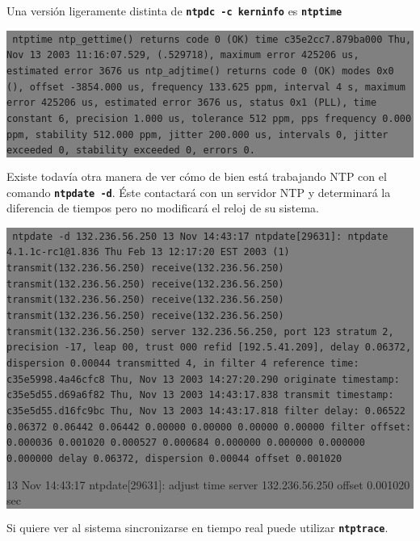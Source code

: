 \documentclass[12pt]{article}
\begin{document}
	
Una versión ligeramente distinta de \texttt{\textbf{ntpdc -c kerninfo}} es \texttt{\textbf{ntptime}}


\colorbox{grey}{\parbox[t]{0.95\linewidth}{ \vspace*{0.5cm} {\tt 
ntptime
ntp\_gettime() returns code 0 (OK)
  time c35e2cc7.879ba000  Thu, Nov 13 2003 11:16:07.529, (.529718),
  maximum error 425206 us, estimated error 3676 us
ntp\_adjtime() returns code 0 (OK)
  modes 0x0 (),
  offset -3854.000 us, frequency 133.625 ppm, interval 4 s,
  maximum error 425206 us, estimated error 3676 us,
  status 0x1 (PLL),
  time constant 6, precision 1.000 us, tolerance 512 ppm,
  pps frequency 0.000 ppm, stability 512.000 ppm, jitter 200.000 us,
  intervals 0, jitter exceeded 0, stability exceeded 0, errors 0.
 } \vspace*{0.5cm} } } 

	
	
	

Existe todavía otra manera de ver cómo de bien está trabajando NTP con 
el comando \texttt{\textbf{ntpdate -d}}. Éste contactará con un servidor NTP y
determinará la diferencia de tiempos pero no modificará el reloj de su sistema.



\colorbox{grey}{\parbox[t]{0.95\linewidth}{ \vspace*{0.5cm} {\tt 
ntpdate -d 132.236.56.250
13 Nov 14:43:17 ntpdate[29631]: ntpdate 4.1.1c-rc1@1.836 Thu Feb 13 12:17:20 EST 2003 (1)
transmit(132.236.56.250)
receive(132.236.56.250)
transmit(132.236.56.250)
receive(132.236.56.250)
transmit(132.236.56.250)
receive(132.236.56.250)
transmit(132.236.56.250)
receive(132.236.56.250)
transmit(132.236.56.250)
server 132.236.56.250, port 123
stratum 2, precision -17, leap 00, trust 000
refid [192.5.41.209], delay 0.06372, dispersion 0.00044
transmitted 4, in filter 4
reference time:    c35e5998.4a46cfc8  Thu, Nov 13 2003 14:27:20.290
originate timestamp: c35e5d55.d69a6f82  Thu, Nov 13 2003 14:43:17.838
transmit timestamp:  c35e5d55.d16fc9bc  Thu, Nov 13 2003 14:43:17.818
filter delay:  0.06522  0.06372  0.06442  0.06442
         0.00000  0.00000  0.00000  0.00000
filter offset: 0.000036 0.001020 0.000527 0.000684
         0.000000 0.000000 0.000000 0.000000
delay 0.06372, dispersion 0.00044
offset 0.001020

13 Nov 14:43:17 ntpdate[29631]: adjust time server 132.236.56.250 offset 0.001020 sec
 } \vspace*{0.5cm} } } 

Si quiere ver al sistema sincronizarse en tiempo real puede utilizar 
\texttt{\textbf{ntptrace}}.
\end{document}
